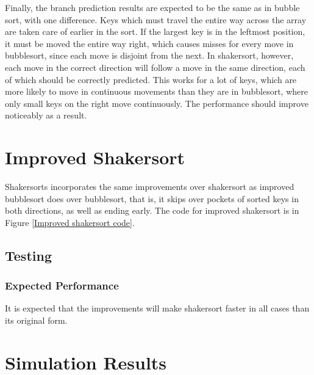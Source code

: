 Finally, the branch prediction results are expected to be the same as in bubble
sort, with one difference.  Keys which must travel the entire way across the
array are taken care of earlier in the sort. If the largest key is in the
leftmost position, it must be moved the entire way right, which causes misses
for every move in bubblesort, since each move is disjoint from the next. In
shakersort, however, each move in the correct direction will follow a move in the
same direction, each of which should be correctly predicted. This works for a
lot of keys, which are more likely to move in continuous movements than they are
in bubblesort, where only small keys on the right move continuously. The
performance should improve noticeably as a result.

\section{Improved Shakersort}
Shakersorts incorporates the same improvements over shakersort as improved bubblesort
does over bubblesort, that is, it skips over pockets of sorted keys in both
directions, as well as ending early. The code for improved shakersort is in Figure
\vref{Improved shakersort code}.

\subsection{Testing}
\subsubsection{Expected Performance}
It is expected that the improvements will make shakersort faster in all cases
than its original form.

\section{Simulation Results}

